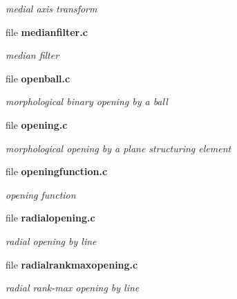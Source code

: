 \begin{DoxyCompactItemize}
\begin{DoxyCompactList}\small\item\em medial axis transform \item\end{DoxyCompactList}

\item 
file {\bf medianfilter.c}


\begin{DoxyCompactList}\small\item\em median filter \item\end{DoxyCompactList}

\item 
file {\bf openball.c}


\begin{DoxyCompactList}\small\item\em morphological binary opening by a ball \item\end{DoxyCompactList}

\item 
file {\bf opening.c}


\begin{DoxyCompactList}\small\item\em morphological opening by a plane structuring element \item\end{DoxyCompactList}

\item 
file {\bf openingfunction.c}


\begin{DoxyCompactList}\small\item\em opening function \item\end{DoxyCompactList}

\item 
file {\bf radialopening.c}


\begin{DoxyCompactList}\small\item\em radial opening by line \item\end{DoxyCompactList}

\item 
file {\bf radialrankmaxopening.c}


\begin{DoxyCompactList}\small\item\em radial rank-\/max opening by line \item\end{DoxyCompactList}


\end{DoxyCompactItemize}
